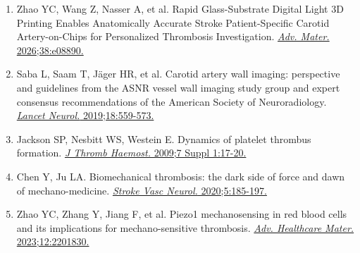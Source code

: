 \documentclass[12pt,a4paper]{article}
\begin{document}
\begin{enumerate}
    \item Zhao YC, Wang Z, Nasser A, et al. Rapid Glass-Substrate Digital Light 3D Printing Enables Anatomically Accurate Stroke Patient-Specific Carotid Artery-on-Chips for Personalized Thrombosis Investigation. \href{https://doi.org/10.1002/adma.202508890}{\textit{Adv. Mater.} 2026;38:e08890.}

    \item Saba L, Saam T, Jäger HR, et al. Carotid artery wall imaging: perspective and guidelines from the ASNR vessel wall imaging study group and expert consensus recommendations of the American Society of Neuroradiology. \href{https://doi.org/10.1016/S1474-4422(19)30036-9}{\textit{Lancet Neurol.} 2019;18:559-573.}

    \item Jackson SP, Nesbitt WS, Westein E. Dynamics of platelet thrombus formation. \href{https://doi.org/10.1111/j.1538-7836.2009.03401.x}{\textit{J Thromb Haemost.} 2009;7 Suppl 1:17-20.}

    \item Chen Y, Ju LA. Biomechanical thrombosis: the dark side of force and dawn of mechano-medicine. \href{https://doi.org/10.1136/svn-2020-000302}{\textit{Stroke Vasc Neurol.} 2020;5:185-197.}

    \item Zhao YC, Zhang Y, Jiang F, et al. Piezo1 mechanosensing in red blood cells and its implications for mechano-sensitive thrombosis. \href{https://doi.org/10.1002/adhm.202201830}{\textit{Adv. Healthcare Mater.} 2023;12:2201830.}
\end{enumerate}
\end{document}
